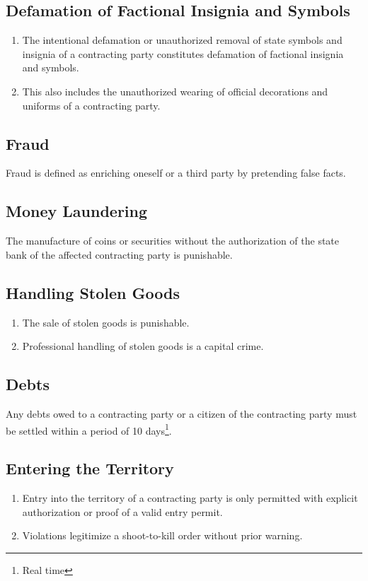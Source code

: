 \documentclass{article}
\begin{document}
\subsection{Defamation of Factional Insignia and Symbols}
\begin{enumerate}[(1)]
    \item The intentional defamation or unauthorized removal of state symbols and insignia of a contracting party constitutes defamation of factional insignia and symbols.
    \item This also includes the unauthorized wearing of official decorations and uniforms of a contracting party.
\end{enumerate}

\subsection{Fraud}
Fraud is defined as enriching oneself or a third party by pretending false facts.

\subsection{Money Laundering}
The manufacture of coins or securities without the authorization of the state bank of the affected contracting party is punishable.

\subsection{Handling Stolen Goods}
\begin{enumerate}[(1)]
    \item The sale of stolen goods is punishable.
    \item Professional handling of stolen goods is a capital crime.
\end{enumerate}

\subsection{Debts}
Any debts owed to a contracting party or a citizen of the contracting party must be settled within a period of 10 days\footnote{Real time}.

\subsection{Entering the Territory}
\begin{enumerate}[(1)]
    \item Entry into the territory of a contracting party is only permitted with explicit authorization or proof of a valid entry permit.
    \item Violations legitimize a shoot-to-kill order without prior warning.
\end{enumerate}
\end{document}
